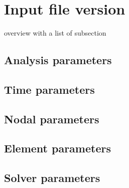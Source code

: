 
\section{Input file version }
\label{sect.inputfile}
overview with a list of subsection
\subsection{Analysis parameters}
\subsection{Time parameters}
\subsection{Nodal parameters}
\subsection{Element parameters}
\subsection{Solver parameters}
